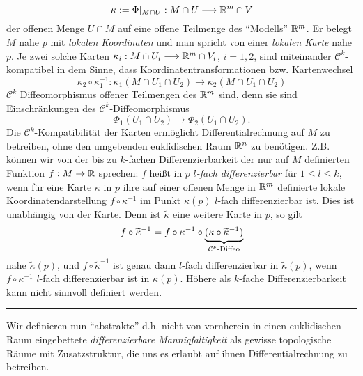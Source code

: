 \begin{equation} \label{karte}
\kappa:= \Phi|_{M\cap U}:M\cap U\longrightarrow \mathbb{R}^m \cap V
\end{equation}
der offenen Menge $U\cap M$  auf eine offene Teilmenge des ``Modells'' $\mathbb{R}^m$. Er belegt $M$ nahe $p$ mit \emph{lokalen Koordinaten} und man spricht von einer \emph{lokalen Karte} nahe $p$. \linebreak Je zwei solche Karten $\kappa_i:M\cap U_i \longrightarrow \mathbb{R}^m\cap V_i$, $i=1,2$, sind miteinander $\mathcal{C}^k$-kompatibel in dem Sinne, dass Koordinatentransformationen bzw. Kartenwechsel
$$\kappa_2 \circ \kappa_1^{-1}:\kappa_1(M\cap U_1\cap U_2) \longrightarrow \kappa_2 (M\cap U_1\cap U_2)$$
$\mathcal{C}^k$ Diffeomorphismus offener Teilmengen des $\mathbb{R}^m$ sind, denn sie sind Einschränkungen des $\mathcal{C}^k$-Diffeomorphismus $$\Phi_1(U_1\cap U_2)\to \Phi_2(U_1\cap U_2).$$ Die $\mathcal{C}^k$-Kompatibilität der Karten ermöglicht Differentialrechnung auf $M$ zu betreiben, ohne den umgebenden euklidischen Raum $\mathbb{R}^n$ zu benötigen. Z.B. können wir von der bis zu $k$-fachen Differenzierbarkeit der nur auf $M$ definierten Funktion $f:M\to \mathbb{R}$ sprechen: $f$ heißt in $p$ \emph{$l$-fach differenzierbar} für $1\leq l \leq k$, wenn für eine Karte $\kappa$ in $p$ ihre auf einer offenen Menge in $\mathbb{R}^m$ definierte lokale Koordinatendarstellung $f\circ \kappa^{-1}$  im Punkt $\kappa(p)$ $l$-fach differenzierbar ist. Dies ist unabhängig von der Karte. Denn ist $\widetilde{\kappa}$ eine weitere Karte in $p$, so gilt
$$ f \circ \widetilde{\kappa}^{-1} = f \circ \kappa^{-1} \circ \underbrace{(\kappa \circ \widetilde{\kappa}^{-1})}_{\mathcal{C}^k\text{-Diffeo}}$$
nahe $\widetilde{\kappa}(p)$, und $f\circ \widetilde{\kappa}^{-1}$ ist genau dann $l$-fach differenzierbar in $\widetilde{\kappa}(p)$, wenn $f\circ \kappa^{-1}$ $l$-fach differenzierbar ist in $\kappa(p)$. Höhere als $k$-fache Differenzierbarkeit kann nicht sinnvoll definiert werden.\\
\rule{\textwidth}{0.4pt}\vspace{0.2pc}
Wir definieren nun ``abstrakte'' d.h. nicht von vornherein in einen euklidischen Raum eingebettete \emph{differenzierbare Mannigfaltigkeit} als gewisse topologische Räume mit Zusatzstruktur, die uns es erlaubt auf ihnen Differentialrechnung zu betreiben.

